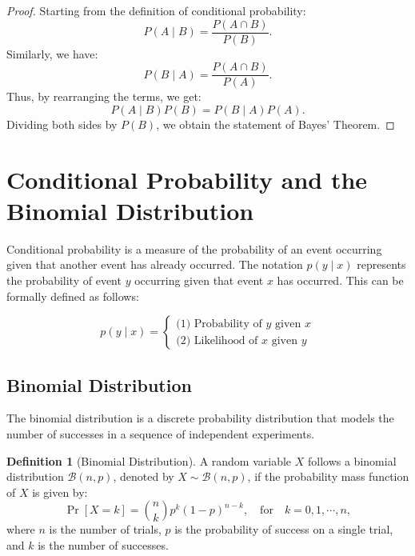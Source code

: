 \documentclass[12pt,openany]{book}
\theoremstyle{definition}
\newtheorem{definition}{Definition}[chapter]
\begin{document}
	\begin{proof}
		Starting from the definition of conditional probability:
		\[
		P(A\mid B) = \frac{P(A \cap B)}{P(B)}.
		\]
		Similarly, we have:
		\[
		P(B\mid A) = \frac{P(A \cap B)}{P(A)}.
		\]
		Thus, by rearranging the terms, we get:
		\[
		P(A\mid B)P(B) = P(B\mid A)P(A).
		\]
		Dividing both sides by $P(B)$, we obtain the statement of Bayes' Theorem.
	\end{proof}
	\section{Conditional Probability and the Binomial Distribution}
	Conditional probability is a measure of the probability of an event occurring given that another event has already occurred. The notation $p(y \mid x)$ represents the probability of event $y$ occurring given that event $x$ has occurred. This can be formally defined as follows:
	
	\[
	p(y\mid x)=
	\begin{cases}
		\text{(1) Probability of $y$ given $x$} \\
		\text{(2) Likelihood of $x$ given $y$}
	\end{cases}
	\]
	
	\subsection{Binomial Distribution}
	The binomial distribution is a discrete probability distribution that models the number of successes in a sequence of independent experiments.
	
	\begin{definition}[Binomial Distribution]
		A random variable $X$ follows a binomial distribution $\mathcal{B}(n, p)$, denoted by $X \sim \mathcal{B}(n, p)$, if the probability mass function of $X$ is given by:
		\[
		\Pr[X=k]=\binom{n}{k}p^k(1-p)^{n-k},\quad\text{for}\quad k=0,1,\cdots,n,
		\]
		where $n$ is the number of trials, $p$ is the probability of success on a single trial, and $k$ is the number of successes.
	\end{definition}
	
\end{document}
